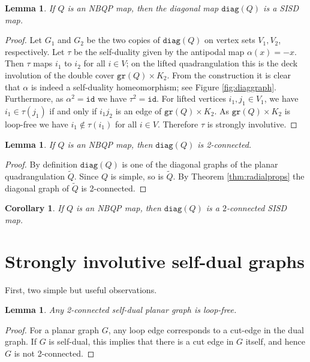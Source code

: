 \documentclass[10pt,a4paper]{article}
\newtheorem{corollary}[theorem]{Corollary}
\newtheorem{lemma}[theorem]{Lemma}
\newcommand{\diag}[0]{\mathtt{diag}}
\newcommand{\gr}{\mathtt{gr}}
\newcommand{\id}{\mathtt{id}}
\begin{document}
\begin{lemma}\label{lem:diagissisd}
    If $Q$ is an NBQP map, then the diagonal map $\diag(Q)$ is a SISD map.
\end{lemma}
\begin{proof}
Let $G_1$ and $G_2$ be the two copies of $\diag(Q)$ on vertex sets $V_1,V_2$, respectively. Let $\tau$ be the self-duality given by the antipodal map $\alpha(x)=-x$. Then $\tau$ maps $i_1$ to $i_2$ for all $i\in V$; on the lifted quadrangulation this is the deck involution of the double cover ${\gr (Q)}\times K_2 $. From the construction it is clear that $\alpha$ is indeed a self-duality homeomorphism; see Figure \ref{fig:diaggraph}. Furthermore, as $\alpha^2=\id$ we have $\tau^2=\id$. For lifted vertices $i_1,j_1\in V_1$, we have $i_1\in \tau(j_1)$ if and only if $i_1j_2$ is an edge of $\gr(Q)\times K_2$. As ${\gr(Q)}\times K_2$ is loop-free we have $i_1\notin \tau(i_1)$ for all $i\in V$. Therefore $\tau$ is strongly involutive.
\end{proof}



\begin{lemma}\label{lem:2connectivity}
If $Q$ is an NBQP map, then $\diag(Q)$ is 2-connected.     
\end{lemma}
\begin{proof}
   
    By definition $\diag(Q)$ is one of the diagonal graphs of the planar quadrangulation $\widetilde{Q}$. Since $Q$ is simple, so is $\widetilde{Q}$.  By Theorem \ref{thm:radialprops} the diagonal graph of $\widetilde Q$ is 2-connected.
    
    
\end{proof}

\begin{corollary}\label{cor:diagis2connsisd}
If $Q$ is an NBQP map, then $\diag(Q)$ is a $2$-connected SISD map.
\end{corollary}

   




\section{Strongly involutive self-dual graphs}\label{sec:sisdgraphs}




First, two simple but useful observations.  

\begin{lemma}\label{lem:selfdualloopfree}
    Any 2-connected self-dual planar graph is loop-free. 
\end{lemma}
\begin{proof}
    For a planar graph $G$, any loop edge corresponds to a cut-edge in the dual graph. If $G$ is self-dual, this implies that there is a cut edge in $G$ itself, and hence $G$ is not 2-connected.
\end{proof}
\end{document}

